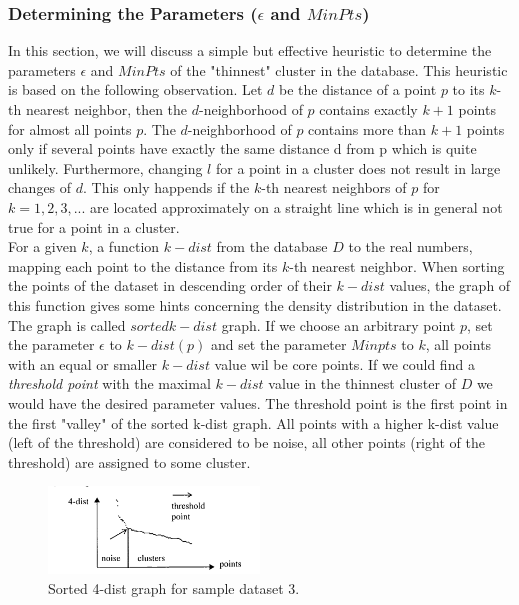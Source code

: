 \documentclass[conference]{IEEEtran}
\begin{document}
\subsubsection{Determining the Parameters (\( \epsilon \) and \( MinPts \))}

In this section, we will discuss a simple but effective heuristic to determine the parameters \( \epsilon \) and \( MinPts \) of the "thinnest" cluster in the database. This heuristic is based on the following observation. Let \( d \) be the distance of a point \( p \) to its \( k \)-th nearest neighbor, then the \( d \)-neighborhood of \( p \) contains exactly \( k + 1 \) points for almost all points \( p \). The \( d \)-neighborhood of \( p \) contains more than \( k + 1 \) points only if several points have exactly the same distance d from p which is quite unlikely. Furthermore, changing \( l \) for a point in a cluster does not result in large changes of \( d \). This only happends if the \( k \)-th nearest neighbors of \( p \) for \( k = 1, 2, 3, ... \) are located approximately on a straight line which is in general not true for a point in a cluster. \\

For a given \( k \), a function \( k-dist \) from the database \( D \) to the real numbers, mapping each point to the distance from its \( k \)-th nearest neighbor. When sorting the points of the dataset in descending order of their \( k-dist \) values, the graph of this function gives some hints concerning the density distribution in the dataset. The graph is called \( sorted k-dist \) graph. If we choose an arbitrary point \( p \), set the parameter \( \epsilon \) to \( k-dist(p) \) and set the parameter \( Minpts \) to \( k \), all points with an equal or smaller \( k-dist \) value wil be core points. If we could find a \textit{threshold point} with the maximal \( k-dist \) value in the 
thinnest cluster of \( D \) we would have the desired parameter values. The threshold point is the first point in the first "valley" of the sorted k-dist graph. All points with a higher k-dist value (left of the threshold) are considered to be noise, all other points (right of the threshold) are assigned to some cluster. \\

\begin{figure}[h]
    \centering
    \includegraphics[width=0.5\textwidth]{4_dist_graph.png}
    \caption{Sorted 4-dist graph for sample dataset 3.}
    \label{fig:4_dist_graph}
\end{figure}
\end{document}
